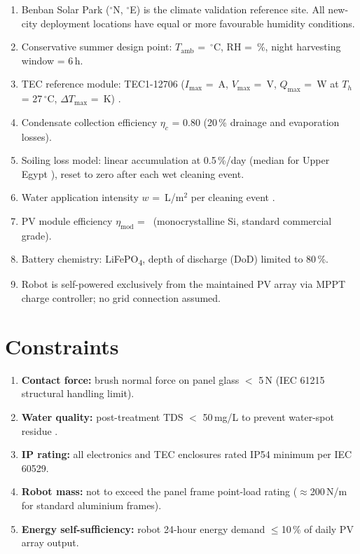 \documentclass[12pt,a4paper]{report}
\numberwithin{equation}{chapter}
\numberwithin{figure}{chapter}
\numberwithin{table}{chapter}
\newcommand{\degC}{$^\circ$C}
\begin{document}
\begin{enumerate}[leftmargin=*, label=\textbf{A\arabic*.}]
  \item Benban Solar Park (\BenbanLat$^\circ$N, \BenbanLon$^\circ$E) is the climate
        validation reference site. All new-city deployment locations have equal or more
        favourable humidity conditions.
  \item Conservative summer design point: $T_\mathrm{amb}$ = \TambSummer\,\degC,
        RH = \RHdesign\,\%, night harvesting window = 6\,h.
  \item TEC reference module: TEC1-12706 ($I_\mathrm{max}$ = \TECImax\,A,
        $V_\mathrm{max}$ = \TECVmax\,V, $Q_\mathrm{max}$ = \TECQmax\,W at
        $T_h$ = 27\,\degC, $\Delta T_\mathrm{max}$ = \TECDTmax\,K)
        \cite{eslami2021tec}.
  \item Condensate collection efficiency $\eta_c$ = 0.80 (20\,\% drainage and
        evaporation losses).
  \item Soiling loss model: linear accumulation at 0.5\,\%/day (median for Upper Egypt
        \cite{kazem2023soiling}), reset to zero after each wet cleaning event.
  \item Water application intensity $w$ = \WaterIntensity\,L/m$^2$ per cleaning event
        \cite{mejia2021cleaning}.
  \item PV module efficiency $\eta_\mathrm{mod}$ = \Etamod\ (monocrystalline Si,
        standard commercial grade).
  \item Battery chemistry: LiFePO\textsubscript{4}, depth of discharge (DoD)
        limited to 80\,\%.
  \item Robot is self-powered exclusively from the maintained PV array via MPPT
        charge controller; no grid connection assumed.
\end{enumerate}

\section{Constraints}

\begin{enumerate}[leftmargin=*, label=\textbf{C\arabic*.}]
  \item \textbf{Contact force:} brush normal force on panel glass $<$ 5\,N
        (IEC 61215 structural handling limit).
  \item \textbf{Water quality:} post-treatment TDS $<$ 50\,mg/L to prevent
        water-spot residue \cite{beattie2012waterspots}.
  \item \textbf{IP rating:} all electronics and TEC enclosures rated IP54 minimum
        per IEC 60529.
  \item \textbf{Robot mass:} not to exceed the panel frame point-load rating
        ($\approx$200\,N/m for standard aluminium frames).
  \item \textbf{Energy self-sufficiency:} robot 24-hour energy demand $\leq$10\,\% of
        daily PV array output.
\end{enumerate}
\end{document}
